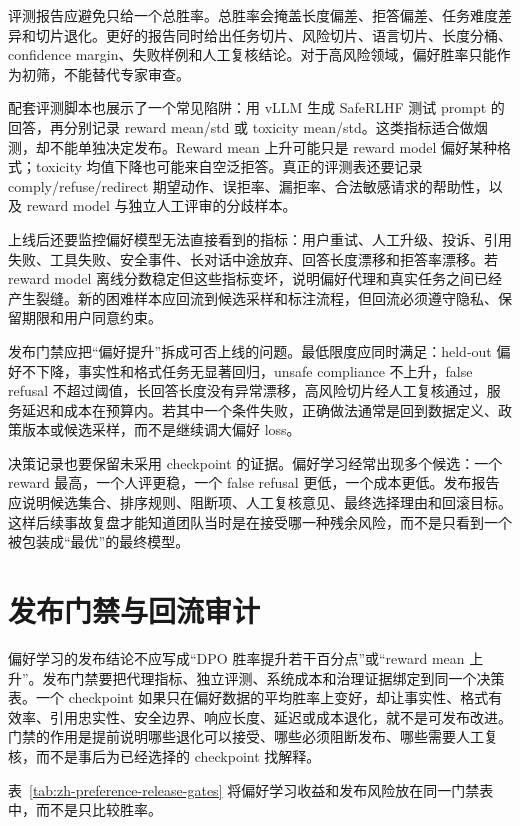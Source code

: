 \documentclass[UTF8,zihao=-4,openany]{ctexbook}
\begin{document}
评测报告应避免只给一个总胜率。总胜率会掩盖长度偏差、拒答偏差、任务难度差异和切片退化。更好的报告同时给出任务切片、风险切片、语言切片、长度分桶、confidence margin、失败样例和人工复核结论。对于高风险领域，偏好胜率只能作为初筛，不能替代专家审查。

配套评测脚本也展示了一个常见陷阱：用 vLLM 生成 SafeRLHF 测试 prompt 的回答，再分别记录 reward mean/std 或 toxicity mean/std。这类指标适合做烟测，却不能单独决定发布。Reward mean 上升可能只是 reward model 偏好某种格式；toxicity 均值下降也可能来自空泛拒答。真正的评测表还要记录 comply/refuse/redirect 期望动作、误拒率、漏拒率、合法敏感请求的帮助性，以及 reward model 与独立人工评审的分歧样本。

上线后还要监控偏好模型无法直接看到的指标：用户重试、人工升级、投诉、引用失败、工具失败、安全事件、长对话中途放弃、回答长度漂移和拒答率漂移。若 reward model 离线分数稳定但这些指标变坏，说明偏好代理和真实任务之间已经产生裂缝。新的困难样本应回流到候选采样和标注流程，但回流必须遵守隐私、保留期限和用户同意约束。

发布门禁应把“偏好提升”拆成可否上线的问题。最低限度应同时满足：held-out 偏好不下降，事实性和格式任务无显著回归，unsafe compliance 不上升，false refusal 不超过阈值，长回答长度没有异常漂移，高风险切片经人工复核通过，服务延迟和成本在预算内。若其中一个条件失败，正确做法通常是回到数据定义、政策版本或候选采样，而不是继续调大偏好 loss。

决策记录也要保留未采用 checkpoint 的证据。偏好学习经常出现多个候选：一个 reward 最高，一个人评更稳，一个 false refusal 更低，一个成本更低。发布报告应说明候选集合、排序规则、阻断项、人工复核意见、最终选择理由和回滚目标。这样后续事故复盘才能知道团队当时是在接受哪一种残余风险，而不是只看到一个被包装成“最优”的最终模型。

\section{发布门禁与回流审计}
偏好学习的发布结论不应写成“DPO 胜率提升若干百分点”或“reward mean 上升”。发布门禁要把代理指标、独立评测、系统成本和治理证据绑定到同一个决策表。一个 checkpoint 如果只在偏好数据的平均胜率上变好，却让事实性、格式有效率、引用忠实性、安全边界、响应长度、延迟或成本退化，就不是可发布改进。门禁的作用是提前说明哪些退化可以接受、哪些必须阻断发布、哪些需要人工复核，而不是事后为已经选择的 checkpoint 找解释。

表~\ref{tab:zh-preference-release-gates} 将偏好学习收益和发布风险放在同一门禁表中，而不是只比较胜率。
\end{document}
